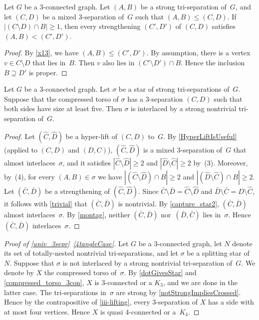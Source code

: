 \documentclass{aic}
\theoremstyle{plain}
\theoremstyle{definition}
\theoremstyle{plain}
\theoremstyle{plain}
\newcommand{\sm}{\setminus}
\renewcommand{\geq}{\geqslant}
\renewcommand{\le}{\leqslant}
\begin{document}
\begin{lem}\label{montag}
Let $G$ be a 3-connected graph.
Let $(A,B)$ be a strong tri-separation of~$G$, and let $(C,D)$ be a mixed 3-separation of~$G$ such that $(A,B)\le (C,D)$.
If $|(C\sm D)\cap B|\geq 1$, then every strengthening $(C',D')$ of $(C,D)$ satisfies $(A,B)<(C',D')$.
\end{lem}

\begin{proof}
By \autoref{x13}, we have $(A,B)\le (C',D')$.
By assumption, there is a vertex $v\in C\sm D$ that lies in~$B$.
Then $v$ also lies in $(C'\sm D')\cap B$.
Hence the inclusion $B\supseteq D'$ is proper.
\end{proof}

\begin{lem}\label{iii-lifting}
Let $G$ be a 3-connected graph.
Let $\sigma$ be a star of strong tri-separations of~$G$.
Suppose that the compressed torso of $\sigma$ has a 3-separation $(C,D)$ such that both sides have size at least five.
Then $\sigma$ is interlaced by a strong nontrivial tri-separation of~$G$.
\end{lem}
\begin{proof}
Let $(\hat C,\hat D)$ be a hyper-lift of $(C,D)$ to~$G$.
By \autoref{HyperLiftIsUseful} (applied to $(C,D)$ and $(D,C)$), $(\hat C,\hat D)$ is a mixed 3-separation of~$G$ that almost interlaces~$\sigma$, and it satisfies $|\hat C\sm \hat D|\geq 2$ and $|\hat D\sm \hat C|\geq 2$ by~(3). 
Moreover, by~(4), for every $(A,B)\in \sigma$ we have $|(\hat C\sm \hat D)\cap B|\geq 2$ and $|(\hat D\sm \hat C)\cap B|\geq 2$. 
Let $(\bar C,\bar D)$ be a strengthening of $(\hat C,\hat D)$.
Since $\bar{C}\sm\bar{D}=\hat C\sm\hat D$ and $\bar{D}\sm\bar{C}=\hat D\sm\hat C$, it follows with \autoref{trivial} that $(\bar C,\bar D)$ is nontrivial.
By \autoref{capture_star2}, $(\bar C,\bar D)$ almost interlaces~$\sigma$.
By \autoref{montag}, neither $(\bar C,\bar D)$ nor~$(\bar D,\bar C)$ lies in~$\sigma$.
Hence $(\bar C,\bar D)$ interlaces~$\sigma$.
\end{proof}


\begin{proof}[Proof of \autoref{univ_3sepr}~\textnormal{\ref{4tangleCase}}]
Let $G$ be a 3-connected graph, let $N$ denote its set of totally-nested nontrivial tri-separations, and let $\sigma$ be a splitting star of~$N$.
Suppose that $\sigma$ is not interlaced by a strong nontrivial tri-separation of~$G$.
We denote by $X$ the compressed torso of~$\sigma$.
By \autoref{dotGivesStar} and \autoref{compressed_torso_3con}, $X$ is 3-connected or a $K_3$, and we are done in the latter case.
The tri-separations in~$\sigma$ are strong by \autoref{notStrongImpliesCrossed}.
Hence by the contrapositive of \autoref{iii-lifting}, every 3-separation of $X$ has a side with at most four vertices.
Hence $X$ is quasi 4-connected or a~$K_4$.
\end{proof}
\end{document}
